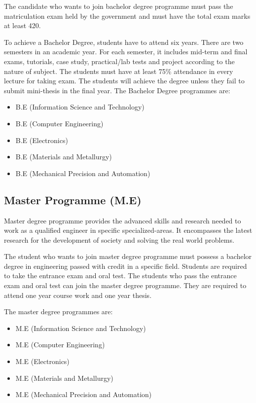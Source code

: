\documentclass[conference]{IEEEtran}
\begin{document}
The candidate who wants to join bachelor degree programme must pass the matriculation exam held by the government and must have the total exam marks at least 420.

To achieve a Bachelor Degree, students have to attend six years. There are two semesters in an academic year. For each semester, it includes mid-term and final exams, tutorials, case study, practical/lab tests and project according to the nature of subject. The students must have at least 75\% attendance in every lecture for taking exam. The students will achieve the degree unless they fail to submit mini-thesis in the final year. 
The Bachelor Degree programmes are:
\begin{itemize}
 \item B.E (Information Science and Technology)
 \item B.E (Computer Engineering)
 \item B.E (Electronics)
 \item B.E (Materials and Metallurgy)
 \item B.E (Mechanical Precision and Automation)
\end{itemize}

\subsection{Master Programme (M.E)}
Master degree programme provides the advanced skills and research needed to work as a qualified engineer in specific specialized-areas. It encompasses the latest research for the development of society and solving the real world problems.

The student who wants to join master degree programme must possess a bachelor degree in engineering passed with credit in a specific field. Students are required to take the entrance exam and oral test. The students who pass the entrance exam and oral test can join the master degree programme. They are required to attend one year course work and one year thesis.

The master degree programmes are:
\begin{itemize}
\item M.E (Information Science and Technology)
\item M.E (Computer Engineering)
\item M.E (Electronics)
\item M.E (Materials and Metallurgy)
\item M.E (Mechanical Precision and Automation)
\end{itemize}
\end{document}
